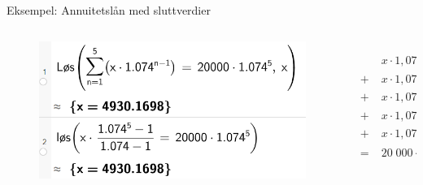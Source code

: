 \greenheader
\begin{frame}[t]{Eksempel: Annuitetslån med sluttverdier}
\begin{center}
\end{center}
\begin{columns}[T,onlytextwidth]
  \begin{column}{0.70\textwidth}
 \begin{figure}
      \centering
      \includegraphics[width=0.8\linewidth]{R2K1E-1.png}
  \end{figure}
  \end{column}
   \begin{column}{0.30\textwidth}
    \begin{align*}
      &\\
      &\\
      &x\cdot 1,074^0\\
      +\;&x\cdot 1,074^1\\
      +\;&x\cdot 1,074^2\\
      +\;&x\cdot 1,074^3\\
     +\;&x\cdot 1,074^4\\
      =\;&20\;000\cdot 1.074^5
    \end{align*}
\end{column}
\end{columns}
\end{frame}

